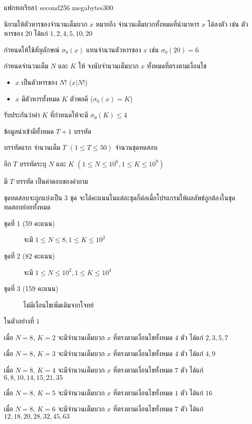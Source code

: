 \documentclass[11pt,a4paper]{article}
\begin{document}
\begin{problem}{แฟกทอเรียล}{}{}{1 second}{256 megabytes}{300}

นิยามให้ตัวหารของจำนวนเต็มบวก $x$ หมายถึง จำนวนเต็มบวกทั้งหมดที่นำมาหาร $x$ ได้ลงตัว เช่น ตัวหารของ $20$ ได้แก่ $1, 2, 4, 5, 10, 20$

กำหนดให้ใช้สัญลักษณ์ $\sigma_0(x)$ แทนจำนวนตัวหารของ $x$ เช่น $\sigma_0(20) = 6$

กำหนดจำนวนเต็ม $N$ และ $K$ ให้ จงนับจำนวนเต็มบวก $x$ ทั้งหมดที่ตรงตามเงื่อนไข
\begin{itemize}
\item $x$ เป็นตัวหารของ $N!$ ($x|N!$)
\item $x$ มีตัวหารทั้งหมด $K$ ตัวพอดี ($\sigma_0(x) = K$)
\end{itemize}
รับประกันว่าค่า $K$ ที่กำหนดให้จะมี $\sigma_0(K) \leq 4$

\InputFile

ข้อมูลนำเข้ามีทั้งหมด $T+1$ บรรทัด

บรรทัดแรก จำนวนเต็ม $T$ $(1 \le T \le 50)$ จำนวนชุดทดสอบ

อีก $T$ บรรทัดระบุ $N$ และ $K$ $(1 \le N \le 10^6, 1 \le K \le 10^9)$

\OutputFile
มี $T$ บรรทัด เป็นคำตอบของคำถาม

\Scoring
ชุดทดสอบจะถูกแบ่งเป็น 3 ชุด จะได้คะแนนในแต่ละชุดก็ต่อเมื่อโปรแกรมให้ผลลัพธ์ถูกต้องในชุดทดสอบย่อยทั้งหมด

\begin{description}
\item[ชุดที่ 1 (59 คะแนน)] จะมี $1 \le N \le 8, 1 \le K \leq 10^2$
\item[ชุดที่ 2 (82 คะแนน)] จะมี $1 \le N \le 10^2, 1 \le K \leq 10^4$
\item[ชุดที่ 3 (159 คะแนน)] ไม่มีเงื่อนไขเพิ่มเติมจากโจทย์
\end{description}

\Examples

\begin{example}
%
%
\end{example}

\Note

ในตัวอย่างที่ $1$

เมื่อ $N=8$, $K=2$ จะมีจำนวนเต็มบวก $x$ ที่ตรงตามเงื่อนไขทั้งหมด $4$ ตัว ได้แก่ $2, 3, 5, 7$

เมื่อ $N=8$, $K=3$ จะมีจำนวนเต็มบวก $x$ ที่ตรงตามเงื่อนไขทั้งหมด $4$ ตัว ได้แก่ $4, 9$

เมื่อ $N=8$, $K=4$ จะมีจำนวนเต็มบวก $x$ ที่ตรงตามเงื่อนไขทั้งหมด $7$ ตัว ได้แก่ $6, 8, 10, 14, 15, 21, 35$

เมื่อ $N=8$, $K=5$ จะมีจำนวนเต็มบวก $x$ ที่ตรงตามเงื่อนไขทั้งหมด $1$ ตัว ได้แก่ $16$

เมื่อ $N=8$, $K=6$ จะมีจำนวนเต็มบวก $x$ ที่ตรงตามเงื่อนไขทั้งหมด $7$ ตัว ได้แก่ $12, 18, 20, 28, 32, 45, 63$

\end{problem}
\end{document}
